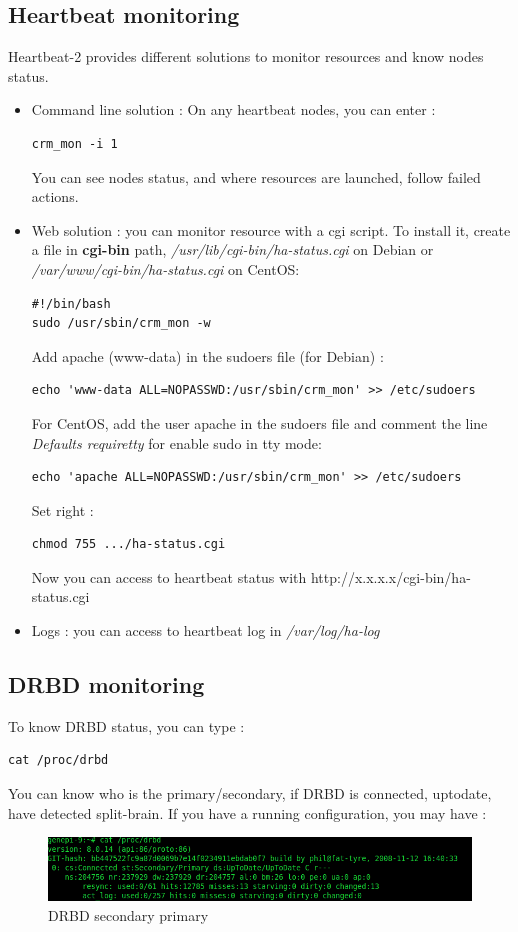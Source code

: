 \documentclass[a4paper,10pt]{report}
\begin{document}
\subsection{Heartbeat monitoring}
\label{hb-monitor}
Heartbeat-2 provides different solutions to monitor resources and know nodes status.
\begin{itemize}
 \item Command line solution : On any heartbeat nodes, you can enter :
\begin{lstlisting}
crm_mon -i 1
\end{lstlisting}
You can see nodes status, and where resources are launched, follow failed actions.
\item Web solution : you can monitor resource with a cgi script. To install it, create a file in \textbf{cgi-bin} path, \textit{/usr/lib/cgi-bin/ha-status.cgi} on Debian or \textit{/var/www/cgi-bin/ha-status.cgi} on CentOS:
\begin{lstlisting}
#!/bin/bash
sudo /usr/sbin/crm_mon -w
\end{lstlisting}
Add apache (www-data) in the sudoers file (for Debian) :
\begin{lstlisting}
echo 'www-data ALL=NOPASSWD:/usr/sbin/crm_mon' >> /etc/sudoers
\end{lstlisting}
For CentOS, add the user apache in the sudoers file and comment the line  \textit{Defaults  requiretty} for enable sudo in tty mode:
\begin{lstlisting}
echo 'apache ALL=NOPASSWD:/usr/sbin/crm_mon' >> /etc/sudoers
\end{lstlisting}
Set right :
\begin{lstlisting}
chmod 755 .../ha-status.cgi
\end{lstlisting}
Now you can access to heartbeat status with http://x.x.x.x/cgi-bin/ha-status.cgi
\item Logs : you can access to heartbeat log in \textit{/var/log/ha-log}

\end{itemize}


\subsection{DRBD monitoring}
To know DRBD status, you can type :\\
\begin{lstlisting}
cat /proc/drbd
\end{lstlisting}


You can know who is the primary/secondary, if DRBD is connected, uptodate, have detected split-brain. If you have a running configuration, you may have :
\begin{figure}[!h]
\begin{center}
\includegraphics[scale=0.5]{schema/drbd-s-p.png}
\end{center}
\caption{DRBD secondary primary} 
\label{drbdstatus} 
\end{figure}
\end{document}
